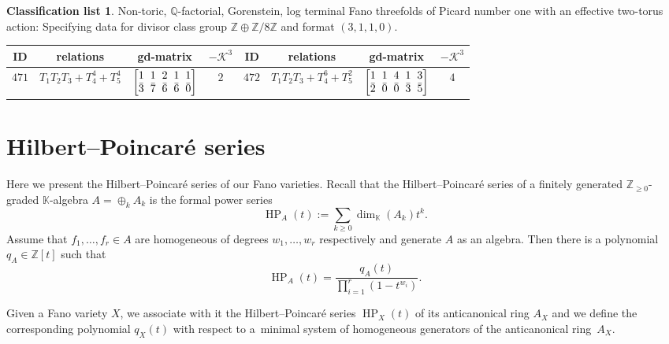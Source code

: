 \documentclass[10pt,a4paper]{amsart}
\theoremstyle{definition}
\newtheorem{class-list}[thm]{Classification list}
\def\KK{{\mathbb K}}
\def\ZZ{{\mathbb Z}}
\def\QQ{{\mathbb Q}}
\DeclareMathOperator\HP{HP}
\numberwithin{equation}{section}
\begin{document}
\begin{class-list}\label{class-list(0,8)}
Non-toric, $\QQ$-factorial, Gorenstein, log terminal Fano
threefolds of Picard number one with an effective two-torus action:
Specifying data for divisor class group $\ZZ\oplus \ZZ/8\ZZ$ and
format $(3,1,1,0)$.
\begin{table}[h!]\centering\setlength{\tabcolsep}{3.5pt}
\renewcommand{\arraystretch}{1.1}\small\tabulinesep=1mm
\begin{tabu}{c|c|c|c||c|c|c|c}
\hline
ID&relations&gd-matrix&$-\mathcal{K}^3$&ID&relations&gd-matrix&$-\mathcal{K}^3$
\\
\hline
${471}$&${T_{1}T_{2}T_{3}+T_{4}^{4}+T_{5}^{4}}$
&$\arraycolsep=1mm\begin{bmatrix}{1} & {1} & {2} & {1} & {1} \\ {\bar{3}} & {\bar{7}} & {\bar{6}} & {\bar{6}} & {\bar{0}}\end{bmatrix}$&${2}$
&${472}$&${T_{1}T_{2}T_{3}+T_{4}^{6}+T_{5}^{2}}$
&$\arraycolsep=1mm\begin{bmatrix}{1} & {1} & {4} & {1} & {3} \\ {\bar{2}} & {\bar{0}} & {\bar{0}} & {\bar{3}} & {\bar{5}}\end{bmatrix}$&${4}$
\\
\hline
\end{tabu}\vspace{-4mm}
\end{table}
\end{class-list}


\section{Hilbert--Poincar\'{e} series}
\label{sec:hilbert-series}

Here we present the Hilbert--Poincar\'{e} series of our
Fano varieties.
Recall that the Hilbert--Poincar\'{e} series of a
finitely generated $\ZZ_{\ge 0}$-graded $\KK$-algebra
$A = \oplus_{k} A_k$ is the formal power series
\[
\HP_A(t) := \sum_{k \ge 0} \dim_\KK(A_k) t^k.
\]
Assume that $f_1,\dots,f_r \in A$ are homogeneous
of degrees $w_1,\dots,w_r$ respectively and generate
$A$ as an algebra.
Then there is a polynomial $q_A \in \ZZ[t]$
such that
\[
\HP_A(t) = \frac{q_A(t)}{\prod_{i=1}^r (1-t^{w_i})}.
\]

Given a Fano variety $X$,
we associate with it the Hilbert--Poincar\'{e}
series $\HP_X(t)$ of its anticanonical ring $A_X$ and
we define the corresponding polynomial $q_X(t)$
with respect to a~minimal system of homogeneous
generators of the anticanonical ring~$A_X$.
\end{document}
